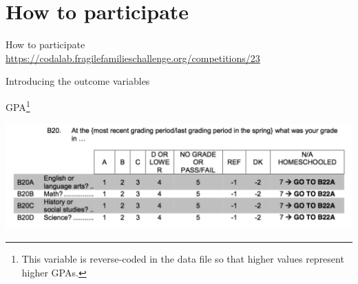 \documentclass{beamer}
\begin{document}
\section{How to participate}
\begin{frame}

\large{
\begin{center}
How to participate\\
\textcolor{blue}{\href{https://codalab.fragilefamilieschallenge.org/competitions/23}{https://codalab.fragilefamilieschallenge.org/competitions/23}}
\end{center}
}

\end{frame}
\begin{frame}

\Large{
\begin{center}
Introducing the outcome variables
\end{center}
}

\end{frame}
\begin{frame}{GPA\footnote{This variable is reverse-coded in the data file so that higher values represent higher GPAs.}}

\centering
\includegraphics[width = .9\textwidth]{figures/GPA_questionnaire}

\end{frame}
\end{document}

